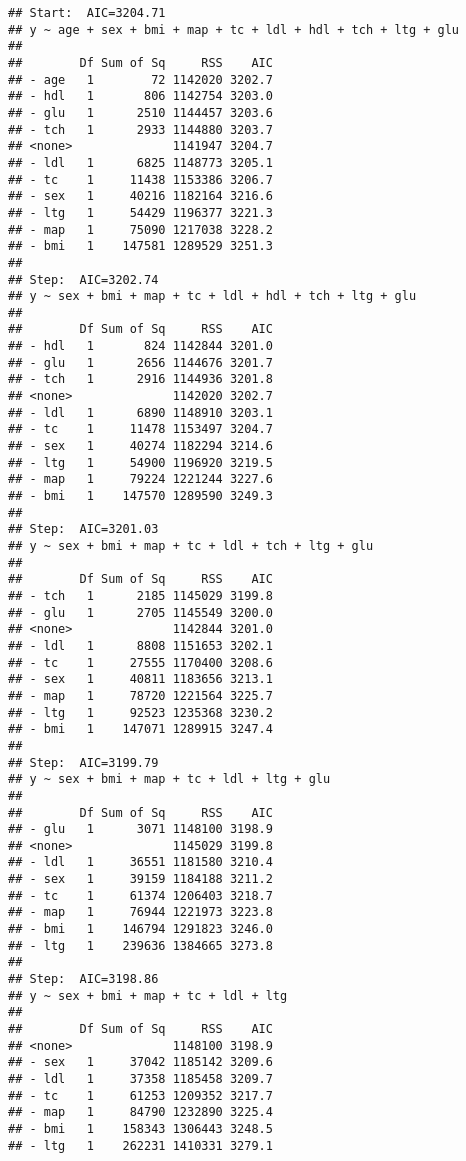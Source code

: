 \documentclass[
]{article}
\begin{document}
\begin{verbatim}
## Start:  AIC=3204.71
## y ~ age + sex + bmi + map + tc + ldl + hdl + tch + ltg + glu
## 
##        Df Sum of Sq     RSS    AIC
## - age   1        72 1142020 3202.7
## - hdl   1       806 1142754 3203.0
## - glu   1      2510 1144457 3203.6
## - tch   1      2933 1144880 3203.7
## <none>              1141947 3204.7
## - ldl   1      6825 1148773 3205.1
## - tc    1     11438 1153386 3206.7
## - sex   1     40216 1182164 3216.6
## - ltg   1     54429 1196377 3221.3
## - map   1     75090 1217038 3228.2
## - bmi   1    147581 1289529 3251.3
## 
## Step:  AIC=3202.74
## y ~ sex + bmi + map + tc + ldl + hdl + tch + ltg + glu
## 
##        Df Sum of Sq     RSS    AIC
## - hdl   1       824 1142844 3201.0
## - glu   1      2656 1144676 3201.7
## - tch   1      2916 1144936 3201.8
## <none>              1142020 3202.7
## - ldl   1      6890 1148910 3203.1
## - tc    1     11478 1153497 3204.7
## - sex   1     40274 1182294 3214.6
## - ltg   1     54900 1196920 3219.5
## - map   1     79224 1221244 3227.6
## - bmi   1    147570 1289590 3249.3
## 
## Step:  AIC=3201.03
## y ~ sex + bmi + map + tc + ldl + tch + ltg + glu
## 
##        Df Sum of Sq     RSS    AIC
## - tch   1      2185 1145029 3199.8
## - glu   1      2705 1145549 3200.0
## <none>              1142844 3201.0
## - ldl   1      8808 1151653 3202.1
## - tc    1     27555 1170400 3208.6
## - sex   1     40811 1183656 3213.1
## - map   1     78720 1221564 3225.7
## - ltg   1     92523 1235368 3230.2
## - bmi   1    147071 1289915 3247.4
## 
## Step:  AIC=3199.79
## y ~ sex + bmi + map + tc + ldl + ltg + glu
## 
##        Df Sum of Sq     RSS    AIC
## - glu   1      3071 1148100 3198.9
## <none>              1145029 3199.8
## - ldl   1     36551 1181580 3210.4
## - sex   1     39159 1184188 3211.2
## - tc    1     61374 1206403 3218.7
## - map   1     76944 1221973 3223.8
## - bmi   1    146794 1291823 3246.0
## - ltg   1    239636 1384665 3273.8
## 
## Step:  AIC=3198.86
## y ~ sex + bmi + map + tc + ldl + ltg
## 
##        Df Sum of Sq     RSS    AIC
## <none>              1148100 3198.9
## - sex   1     37042 1185142 3209.6
## - ldl   1     37358 1185458 3209.7
## - tc    1     61253 1209352 3217.7
## - map   1     84790 1232890 3225.4
## - bmi   1    158343 1306443 3248.5
## - ltg   1    262231 1410331 3279.1
\end{verbatim}
\end{document}
